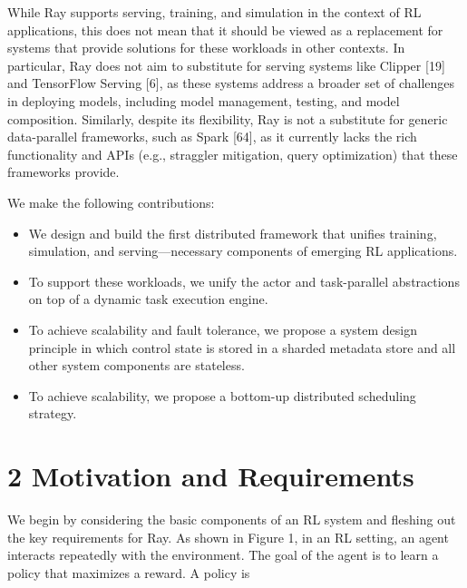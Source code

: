 \documentclass[
]{article}
\providecommand{\tightlist}{%
  \setlength{\itemsep}{0pt}\setlength{\parskip}{0pt}}
\begin{document}
While Ray supports serving, training, and simulation in the context of
RL applications, this does not mean that it should be viewed as a
replacement for systems that provide solutions for these workloads in
other contexts. In particular, Ray does not aim to substitute for
serving systems like Clipper {[}19{]} and TensorFlow Serving {[}6{]}, as
these systems address a broader set of challenges in deploying models,
including model management, testing, and model composition. Similarly,
despite its flexibility, Ray is not a substitute for generic
data-parallel frameworks, such as Spark {[}64{]}, as it currently lacks
the rich functionality and APIs (e.g., straggler mitigation, query
optimization) that these frameworks provide.

We make the following contributions:

\begin{itemize}
\tightlist
\item
  We design and build the first distributed framework that unifies
  training, simulation, and serving---necessary components of emerging
  RL applications.\\
\item
  To support these workloads, we unify the actor and task-parallel
  abstractions on top of a dynamic task execution engine.\\
\item
  To achieve scalability and fault tolerance, we propose a system design
  principle in which control state is stored in a sharded metadata store
  and all other system components are stateless.\\
\item
  To achieve scalability, we propose a bottom-up distributed scheduling
  strategy.
\end{itemize}

\section{2 Motivation and
Requirements}\label{motivation-and-requirements}

We begin by considering the basic components of an RL system and
fleshing out the key requirements for Ray. As shown in Figure 1, in an
RL setting, an agent interacts repeatedly with the environment. The goal
of the agent is to learn a policy that maximizes a reward. A policy is
\end{document}
